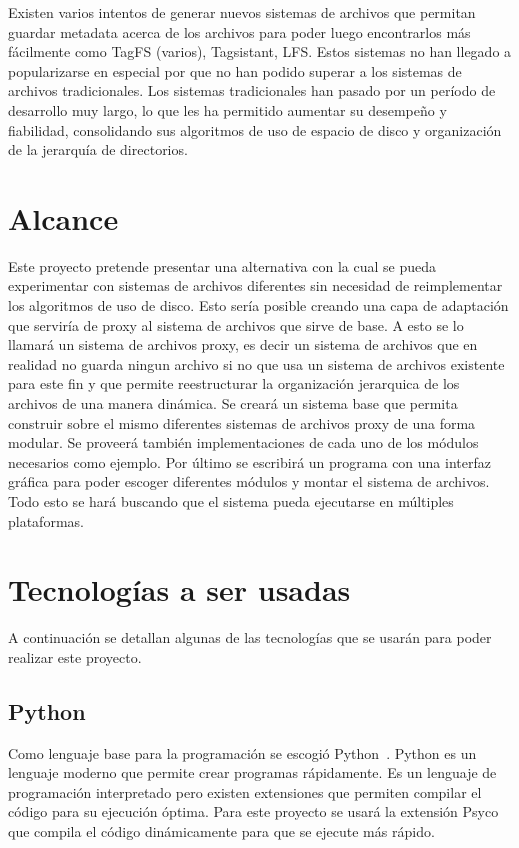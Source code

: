 Existen varios intentos de generar nuevos sistemas de archivos que permitan guardar metadata acerca de los archivos para poder luego encontrarlos más fácilmente como TagFS (varios), Tagsistant, LFS. Estos sistemas no han llegado a popularizarse en especial por que no han podido superar a los sistemas de archivos tradicionales. Los sistemas tradicionales han pasado por un período de desarrollo muy largo, lo que les ha permitido aumentar su desempeño y fiabilidad, consolidando sus algoritmos de uso de espacio de disco y organización de la jerarquía de directorios.


\section{Alcance}

Este proyecto pretende presentar una alternativa con la cual se pueda experimentar con sistemas de archivos diferentes sin necesidad de reimplementar los algoritmos de uso de disco. Esto sería posible creando una capa de adaptación que serviría de proxy al sistema de archivos que sirve de base. A esto se lo llamará un sistema de archivos proxy, es decir un sistema de archivos que en realidad no guarda ningun archivo si no que usa un sistema de archivos existente para este fin y que permite reestructurar la organización jerarquica de los archivos de una manera dinámica. Se creará un sistema base que permita construir sobre el mismo diferentes sistemas de archivos proxy de una forma modular. Se proveerá también implementaciones de cada uno de los módulos necesarios como ejemplo. Por último se escribirá un programa con una interfaz gráfica para poder escoger diferentes módulos y montar el sistema de archivos. Todo esto se hará buscando que el sistema pueda ejecutarse en múltiples plataformas.


\section{Tecnologías a ser usadas}

A continuación se detallan algunas de las tecnologías que se usarán para poder realizar este proyecto.

\subsection{Python}

Como lenguaje base para la programación se escogió Python~\cite{python:website}. Python es un lenguaje moderno que permite crear programas rápidamente. Es un lenguaje de programación interpretado pero existen extensiones que permiten compilar el código para su ejecución óptima. Para este proyecto se usará la extensión Psyco~\cite{psyco:website} que compila el código dinámicamente para que se ejecute más rápido.

